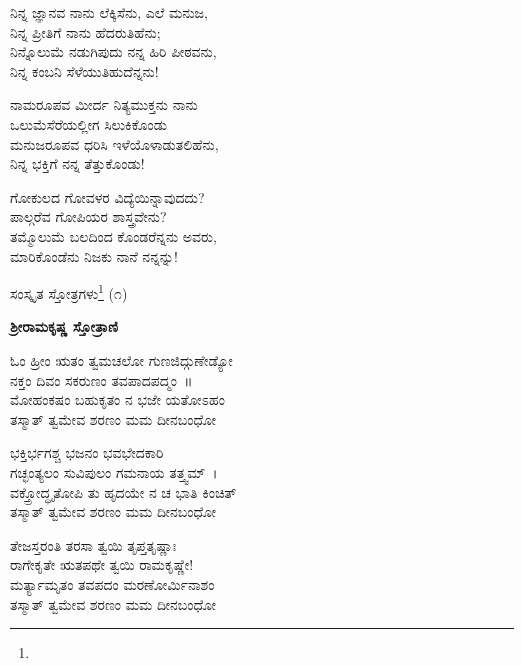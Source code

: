 \begin{myquote}
ನಿನ್ನ ಜ್ಞಾನವ ನಾನು ಲೆಕ್ಕಿಸೆನು, ಎಲೆ ಮನುಜ,\\ನಿನ್ನ ಪ್ರೀತಿಗೆ ನಾನು ಹೆದರುತಿಹೆನು;\\ನಿನ್ನೊಲುಮೆ ನಡುಗಿಪುದು ನನ್ನ ಹಿರಿ ಪೀಠವನು,\\ನಿನ್ನ ಕಂಬನಿ ಸೆಳೆಯುತಿಹುದೆನ್ನನು!
\end{myquote}

\begin{myquote}
ನಾಮರೂಪವ ಮೀರ್ದ ನಿತ್ಯಮುಕ್ತನು ನಾನು\\ಒಲುಮೆಸೆರೆಯಲ್ಲೀಗ ಸಿಲುಕಿಕೊಂಡು\\ಮನುಜರೂಪವ ಧರಿಸಿ ಇಳೆಯೊಳಾಡುತಲಿಹೆನು,\\ನಿನ್ನ ಭಕ್ತಿಗೆ ನನ್ನ ತೆತ್ತುಕೊಂಡು!
\end{myquote}

\begin{myquote}
ಗೋಕುಲದ ಗೋವಳರ ವಿದ್ಯೆಯಿನ್ನಾವುದದು?\\ಪಾಲ್ಗರೆವ ಗೋಪಿಯರ ಶಾಸ್ತ್ರವೇನು?\\ತಮ್ಮೊಲುಮೆ ಬಲದಿಂದ ಕೊಂಡರೆನ್ನನು ಅವರು,\\ಮಾರಿಕೊಂಡೆನು ನಿಜಕು ನಾನೆ ನನ್ನನ್ನು!
\end{myquote}

ಸಂಸ್ಕೃತ ಸ್ತೋತ್ರಗಳು\protect\footnote{} (೧)

\begin{center}
\textbf{ಶ‍್ರೀರಾಮಕೃಷ್ಣ ಸ್ತೋತ್ರಾಣಿ}
\end{center}

\begin{myquote}
ಓಂ ಹ್ರೀಂ ಋತಂ ತ್ವಮಚಲೋ ಗುಣಜಿದ್ಗುಣೇಡ್ಯೋ\\ನಕ್ತಂ ದಿವಂ ಸಕರುಣಂ ತವಪಾದಪದ್ಮಂ~॥\\ಮೋಹಂಕಷಂ ಬಹುಕೃತಂ ನ ಭಜೇ ಯತೋಽಹಂ\\ತಸ್ಮಾತ್ ತ್ವಮೇವ ಶರಣಂ ಮಮ ದೀನಬಂಧೋ
\end{myquote}


\begin{myquote}
ಭಕ್ತಿರ್ಭಗಶ್ಚ ಭಜನಂ ಭವಭೇದಕಾರಿ\\ಗಚ್ಛಂತ್ಯಲಂ ಸುವಿಪುಲಂ ಗಮನಾಯ ತತ್ತ್ವಮ್~।\\ವಕ್ತ್ರೋದ್ಧೃತೋಪಿ ತು ಹೃದಯೇ ನ ಚ ಭಾತಿ ಕಿಂಚಿತ್\\ತಸ್ಮಾತ್ ತ್ವಮೇವ ಶರಣಂ ಮಮ ದೀನಬಂಧೋ
\end{myquote}


\begin{myquote}
ತೇಜಸ್ತರಂತಿ ತರಸಾ ತ್ವಯಿ ತೃಪ್ತತೃಷ್ಣಾಃ\\ರಾಗೇಕೃತೇ ಋತಪಥೇ ತ್ವಯಿ ರಾಮಕೃಷ್ಣೇ!\\ಮರ್ತ್ಯಾಮೃತಂ ತವಪದಂ ಮರಣೋರ್ಮಿನಾಶಂ\\ತಸ್ಮಾತ್ ತ್ವಮೇವ ಶರಣಂ ಮಮ ದೀನಬಂಧೋ
\end{myquote}

